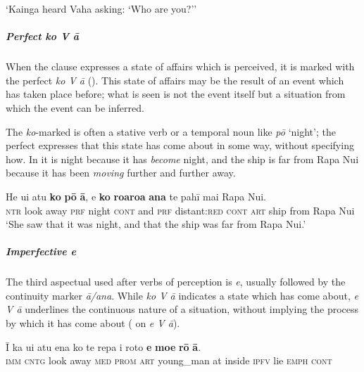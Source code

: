 \glt 
‘Kainga heard Vaha asking: ‘Who are you?’’ \textstyleExampleref{[Mtx-3-01.127]}
\z

\subparagraph{Perfect  \textit{ko V {\ꞌ}ā}} When the clause expresses a state of affairs which is perceived, it is marked with the perfect  \textit{ko V {\ꞌ}ā} (). This state of affairs may be the result of an event which has taken place before; what is seen is not the event itself but a situation from which the event can be inferred. 

The \textit{ko}{}-marked  is often a stative verb or a temporal noun like \textit{pō} ‘night’; the perfect  expresses that this state has come about in some way, without specifying how. In  it is night because it has \textit{become} night, and the ship is far from Rapa Nui because it has been \textit{moving} further and further away. 

\ea\label{ex:11.35}
\gll He u{\ꞌ}i atu \textbf{ko} \textbf{pō} \textbf{{\ꞌ}ā}, {\ꞌ}e \textbf{ko} \textbf{roaroa} \textbf{{\ꞌ}ana} te pahī mai Rapa Nui.\\
\textsc{ntr} look away \textsc{prf} night \textsc{cont} and \textsc{prf} distant:\textsc{red} \textsc{cont} \textsc{art} ship from Rapa Nui\\

\glt 
‘She saw that it was night, and that the ship was far from Rapa Nui.’ \textstyleExampleref{[R210.116]} 
\z

\subparagraph{Imperfective \textit{e}} The third aspectual used after verbs of perception is  \textit{e}, usually followed by the continuity marker \textit{{\ꞌ}ā/{\ꞌ}ana}. While \textit{ko V {\ꞌ}ā} indicates a state which has come about, \textit{e V {\ꞌ}ā} underlines the continuous nature of a situation, without implying the process by which it has come about ( on \textit{e V {\ꞌ}ā}).

\ea\label{ex:11.36}
\gll {\ꞌ}Ī ka u{\ꞌ}i atu ena ko te repa {\ꞌ}i roto \textbf{e} \textbf{moe} \textbf{rō} \textbf{{\ꞌ}ā}. \\
\textsc{imm} \textsc{cntg} look away \textsc{med} \textsc{prom} \textsc{art} young\_man at inside \textsc{ipfv} lie \textsc{emph} \textsc{cont} \\

